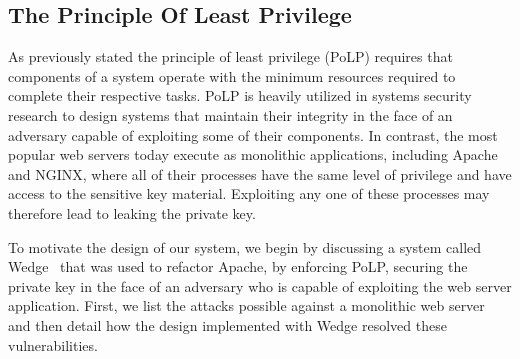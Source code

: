 \documentclass[../main.tex]{subfiles}
\begin{document}
	\subsection{The Principle Of Least Privilege}
	As previously stated the principle of least privilege (PoLP) requires that components of a system operate with the minimum resources required to complete their respective tasks. PoLP is heavily utilized in systems security research to design systems that maintain their integrity in the face of an adversary capable of exploiting some of their components. In contrast, the most popular web servers today execute as monolithic applications, including Apache and NGINX, where all of their processes have the same level of privilege and have access to the sensitive key material. Exploiting any one of these processes may therefore lead to leaking the private key. 

	To motivate the design of our system, we begin by discussing a system called Wedge~\cite{Bittau08} that was used to refactor Apache, by enforcing PoLP, securing the private key in the face of an adversary who is capable of exploiting the web server application. First, we list the attacks possible against a monolithic web server and then detail how the design implemented with Wedge resolved these vulnerabilities. 
\end{document}
